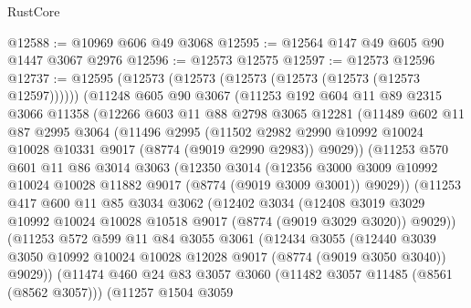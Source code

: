 \begin{lexlean}{RustCore}
\begin{coremodule}
@12588 := @10969 @606 @49 @3068
@12595 := @12564 @147 @49 @605 @90 @1447 @3067 @2976
@12596 := @12573 @12575
@12597 := @12573 @12596
@12737 := @12595
    (@12573 (@12573 (@12573 (@12573 (@12573 (@12573 @12597))))))
    (@11248
      @605
      @90
      @3067
      (@11253
        @192
        @604
        @11
        @89
        @2315
        @3066
        @11358
        (@12266
          @603
          @11
          @88
          @2798
          @3065
          @12281
          (@11489
            @602
            @11
            @87
            @2995
            @3064
            (@11496
              @2995
              (@11502
                @2982
                @2990
                @10992
                @10024
                @10028
                @10331
                @9017
                (@8774 (@9019 @2990 @2983))
                @9029))
            (@11253
              @570
              @601
              @11
              @86
              @3014
              @3063
              (@12350
                @3014
                (@12356
                  @3000
                  @3009
                  @10992
                  @10024
                  @10028
                  @11882
                  @9017
                  (@8774 (@9019 @3009 @3001))
                  @9029))
              (@11253
                @417
                @600
                @11
                @85
                @3034
                @3062
                (@12402
                  @3034
                  (@12408
                    @3019
                    @3029
                    @10992
                    @10024
                    @10028
                    @10518
                    @9017
                    (@8774 (@9019 @3029 @3020))
                    @9029))
                (@11253
                  @572
                  @599
                  @11
                  @84
                  @3055
                  @3061
                  (@12434
                    @3055
                    (@12440
                      @3039
                      @3050
                      @10992
                      @10024
                      @10028
                      @12028
                      @9017
                      (@8774 (@9019 @3050 @3040))
                      @9029))
                  (@11474
                    @460
                    @24
                    @83
                    @3057
                    @3060
                    (@11482 @3057 @11485 (@8561 (@8562 @3057)))
                    (@11257
                      @1504
                      @3059

\end{coremodule}
\end{lexlean}
